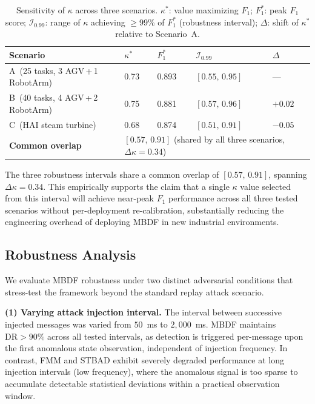 \documentclass[manuscript,screen,review]{acmart}
\begin{document}
\begin{table}[!t]
\renewcommand{\arraystretch}{1.3}
\caption{Sensitivity of $\kappa$ across three scenarios.
$\kappa^{*}$: value maximizing $F_1$;
$F_1^{*}$: peak $F_1$ score;
$\mathcal{I}_{0.99}$: range of $\kappa$ achieving
$\geq$99\% of $F_1^{*}$ (robustness interval);
$\Delta$: shift of $\kappa^{*}$ relative to Scenario~A.}
\label{tab:kappa_sensitivity}
\centering
\small
\begin{tabular}{lllll}
\toprule
\textbf{Scenario} &
$\kappa^{*}$ & $F_1^{*}$ &
$\mathcal{I}_{0.99}$ & $\Delta$ \\
\midrule
A\ (25 tasks, 3 AGV\,+\,1 RobotArm)  &
  0.73 & 0.893 & $[0.55,\,0.95]$ & ---     \\
B\ (40 tasks, 4 AGV\,+\,2 RobotArm)  &
  0.75 & 0.881 & $[0.57,\,0.96]$ & $+0.02$ \\
C\ (HAI steam turbine)           &
  0.68 & 0.874 & $[0.51,\,0.91]$ & $-0.05$ \\
\midrule
\textbf{Common overlap} &
\multicolumn{4}{l}{$[0.57,\,0.91]$
  (shared by all three scenarios,
  $\Delta\kappa = 0.34$)} \\
\bottomrule
\end{tabular}
\end{table}

The three robustness intervals share a common overlap of
$[0.57,\,0.91]$, spanning $\Delta\kappa = 0.34$. This
empirically supports the claim that a single $\kappa$
value selected from this interval will achieve near-peak
$F_1$ performance across all three tested scenarios
without per-deployment re-calibration, substantially
reducing the engineering overhead of deploying MBDF in
new industrial environments.

\subsection{Robustness Analysis}
\label{sec:robustness}

We evaluate MBDF robustness under two distinct adversarial
conditions that stress-test the framework beyond the
standard replay attack scenario.

\textbf{(1) Varying attack injection interval.}
The interval between successive injected messages was
varied from $50$~ms to $2{,}000$~ms. MBDF maintains
$\mathrm{DR} > 90\%$ across all tested intervals, as
detection is triggered per-message upon the first
anomalous state observation, independent of injection
frequency. In contrast, FMM and STBAD exhibit severely
degraded performance at long injection intervals (low
frequency), where the anomalous signal is too sparse to
accumulate detectable statistical deviations within a
practical observation window.
\end{document}
